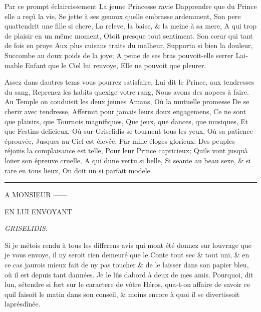 \documentclass[14pt,a4paper]{memoir}
\begin{document}
\begin{otherlanguage}{french}
{Par ce prompt éclaircissement} {La jeune Princesse ravie}
{D\textquotesingle apprendre que du Prince elle a reçû la vie,} {Se
jette à ses genoux qu\textquotesingle elle embrasse ardemment, } {Son
pere qu\textquotesingle attendrit une fille si chere,} {La releve, la
baise, \& la meine à sa mere,} {A qui trop de plaisir en un même
moment,} {Otoit presque tout sentiment.} {Son cœur qui tant de fois en
proye} {Aux plus cuisans traits du malheur,} {Supporta si bien la
douleur,} {Succombe au doux poids de la joye;} {A peine de ses bras
pouvoit-elle serrer} {L\textquotesingle aimable Enfant que le Ciel lui
renvoye,} {Elle ne pouvoit que pleurer.}

{Assez dans d\textquotesingle autres tems vous pourrez satisfaire, }
{Lui dit le Prince, aux tendresses du sang,} {Reprenez les habits
qu\textquotesingle exige votre rang,} {Nous avons des nopces à faire.}
{Au Temple on conduisit les deux jeunes Amans,} {Où la mutuelle
promesse} {De se cherir avec tendresse,} {Affermit pour jamais leurs
doux engagemens,} {Ce ne sont que plaisirs, que Tournois magnifiques,}
{Que jeux, que dances, que musiques,} {Et que Festins delicieux,} {Où
sur Griselidis se tournent tous les yeux,} {Où sa patience éprouvée,}
{Jusques au Ciel est élevée,} {Par mille éloges glorieux:} {Des peuples
réjoüis la complaisance est telle,} {Pour leur Prince capricieux;}
{Qu\textquotesingle ils vont jusqu\textquotesingle à loüer son épreuve
cruelle,} {A qui d\textquotesingle une vertu si belle,} {Si seante au
beau sexe, \& si rare en tous lieux,} {On doit un si parfait modele.}

\begin{center}\rule{0.5\linewidth}{0.5pt}\end{center}

A MONSIEUR ------

EN LUI ENVOYANT

\emph{GRISELIDIS}.

Si je m\textquotesingle étois rendu à tous les differens avis qui
m\textquotesingle ont été donnez sur l\textquotesingle ouvrage que je
vous envoye, il n\textquotesingle y seroit rien demeuré que le Conte
tout sec \& tout uni, \& en ce cas j\textquotesingle aurois mieux fait
de n\textquotesingle y pas toucher \& de le laisser dans son papier
bleu, où il est depuis tant d\textquotesingle années. Je le lûs
d\textquotesingle abord à deux de mes amis. Pourquoi, dit
l\textquotesingle un, s\textquotesingle étendre si fort sur le caractere
de vôtre Héros, qu\textquotesingle a-t-on affaire de savoir ce
qu\textquotesingle il faisoit le matin dans son conseil, \& moins encore
à quoi il se divertissoit l\textquotesingle aprésdînée.


\end{otherlanguage}
\end{document}
